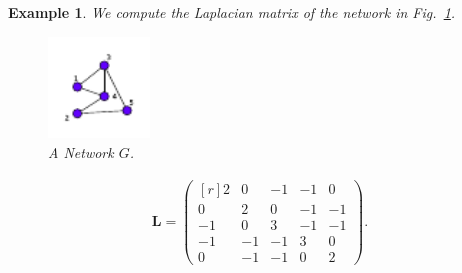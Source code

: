 \documentclass[10pt,a4paper]{article}
\newtheorem{exa}{Example}
\begin{document}
\begin{exa} We compute the Laplacian matrix of the network in Fig.~\ref{fig:laplace-graph}.
	\begin{figure}[!h]
		\centering 
		\includegraphics[width=0.24\textwidth]{images/laplace-graph.pdf}
		\caption{A Network $G$.}
		\label{fig:laplace-graph}
	\end{figure} 
	
	\begin{align*}
	\mathbf{L} = \begin{pmatrix*}[r]
	2 & 0 &-1 & -1  & 0 \\
	0 & 2 & 0 & -1 & -1 \\
	-1 & 0 &  3 & -1 & -1  \\
	-1 & -1 & -1 & 3 & 0 \\
	0 & -1 & -1 & 0 &  2
	\end{pmatrix*}.
	\end{align*}
	
	\label{example:laplace}
\end{exa}
\end{document}
